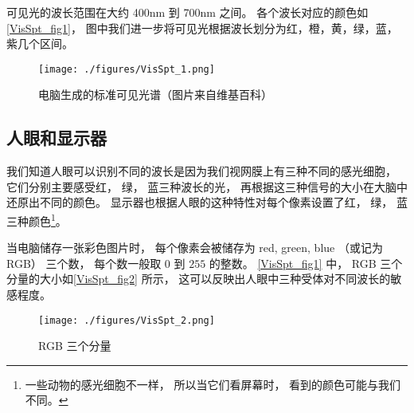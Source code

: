 
可见光的波长范围在大约 400nm 到 700nm 之间。 各个波长对应的颜色如\autoref{VisSpt_fig1}， 图中我们进一步将可见光根据波长划分为红，橙，黄，绿，蓝，紫几个区间。

\begin{figure}[ht]
\centering
\texttt{[image: ./figures/VisSpt\_1.png]}
\caption{电脑生成的标准可见光谱（图片来自维基百科）} \label{VisSpt_fig1}
\end{figure}

\subsection{人眼和显示器}
我们知道人眼可以识别不同的波长是因为我们视网膜上有三种不同的感光细胞， 它们分别主要感受红， 绿， 蓝三种波长的光， 再根据这三种信号的大小在大脑中还原出不同的颜色。 显示器也根据人眼的这种特性对每个像素设置了红， 绿， 蓝三种颜色\footnote{一些动物的感光细胞不一样， 所以当它们看屏幕时， 看到的颜色可能与我们不同。}。

当电脑储存一张彩色图片时， 每个像素会被储存为 red, green, blue （或记为 RGB） 三个数， 每个数一般取 $0$ 到 $255$ 的整数。 \autoref{VisSpt_fig1} 中， RGB 三个分量的大小如\autoref{VisSpt_fig2} 所示， 这可以反映出人眼中三种受体对不同波长的敏感程度。

\begin{figure}[ht]
\centering
\texttt{[image: ./figures/VisSpt\_2.png]}
\caption{RGB 三个分量} \label{VisSpt_fig2}
\end{figure}
